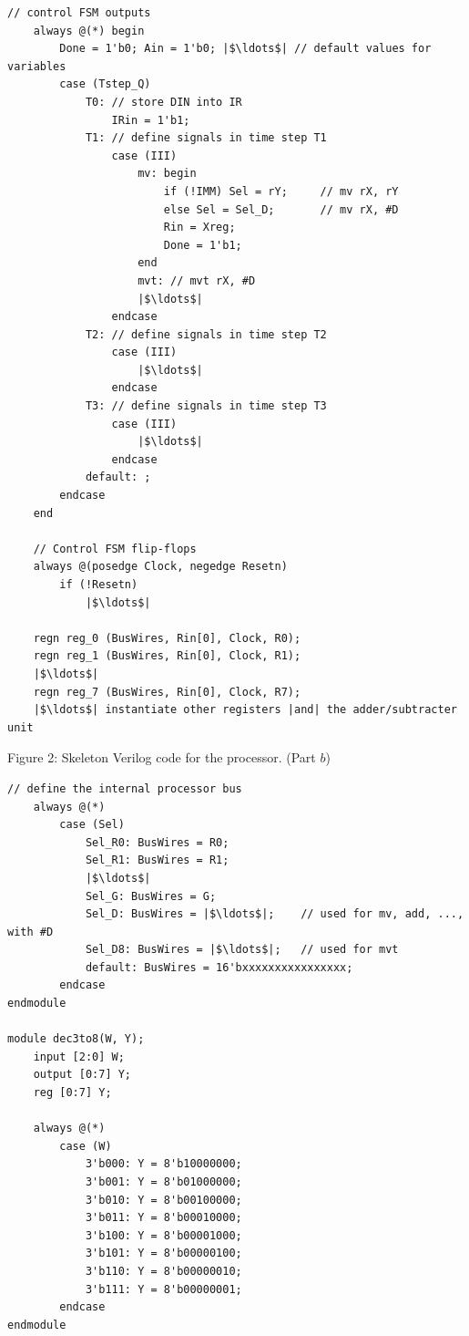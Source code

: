 \documentclass[epsfig,10pt,fullpage]{article}
\begin{document}
\begin{enumerate}
\begin{center}
\begin{minipage}[t]{15 cm}
\begin{lstlisting}[name=proc]
    // control FSM outputs
    always @(*) begin
        Done = 1'b0; Ain = 1'b0; |$\ldots$| // default values for variables
        case (Tstep_Q)
            T0: // store DIN into IR
                IRin = 1'b1;
            T1: // define signals in time step T1
                case (III)
                    mv: begin
                        if (!IMM) Sel = rY;     // mv rX, rY
                        else Sel = Sel_D;       // mv rX, #D
                        Rin = Xreg;
                        Done = 1'b1;
                    end
                    mvt: // mvt rX, #D
                    |$\ldots$|
                endcase
            T2: // define signals in time step T2
                case (III)
                    |$\ldots$|
                endcase
            T3: // define signals in time step T3
                case (III)
                    |$\ldots$|
                endcase
            default: ;
        endcase
    end

    // Control FSM flip-flops
    always @(posedge Clock, negedge Resetn)
        if (!Resetn)
            |$\ldots$|

    regn reg_0 (BusWires, Rin[0], Clock, R0);
    regn reg_1 (BusWires, Rin[0], Clock, R1);
    |$\ldots$|
    regn reg_7 (BusWires, Rin[0], Clock, R7);
    |$\ldots$| instantiate other registers |and| the adder/subtracter unit
\end{lstlisting}
\end{minipage}
\end{center}

\begin{center}
Figure 2: Skeleton Verilog code for the processor. (Part $b$)
\end{center}

\begin{center}
\begin{minipage}[t]{15 cm}
\begin{lstlisting}[name=proc]
    // define the internal processor bus
    always @(*)
        case (Sel)
            Sel_R0: BusWires = R0;
            Sel_R1: BusWires = R1;
            |$\ldots$|
            Sel_G: BusWires = G;
            Sel_D: BusWires = |$\ldots$|;    // used for mv, add, ..., with #D
            Sel_D8: BusWires = |$\ldots$|;   // used for mvt
            default: BusWires = 16'bxxxxxxxxxxxxxxxx;
        endcase
endmodule

module dec3to8(W, Y);
    input [2:0] W;
    output [0:7] Y;
    reg [0:7] Y;
   
    always @(*)
        case (W)
            3'b000: Y = 8'b10000000;
            3'b001: Y = 8'b01000000;
            3'b010: Y = 8'b00100000;
            3'b011: Y = 8'b00010000;
            3'b100: Y = 8'b00001000;
            3'b101: Y = 8'b00000100;
            3'b110: Y = 8'b00000010;
            3'b111: Y = 8'b00000001;
        endcase
endmodule
\end{lstlisting}
\end{minipage}
\end{center}


\end{enumerate}
\end{document}

